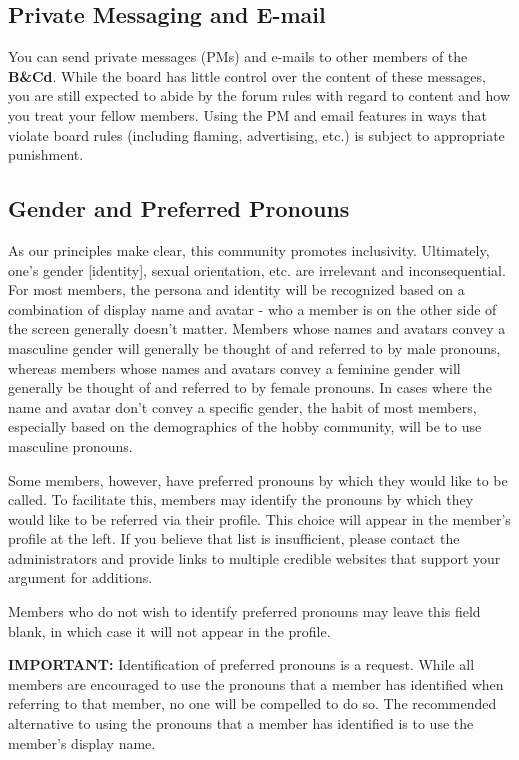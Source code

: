 \documentclass[12pt]{article}
\newcommand{\BnC}{{\textbf{B\&Cd}}}%
\begin{document}
\subsection{Private Messaging and E-mail}

You can send private messages (PMs) and e-mails to other members of the 
{\BnC}. While the board has little control over the 
content of these messages, you are still expected to abide by the forum 
rules with regard to content and how you treat your fellow members. 
Using the PM and email features in ways that violate board rules 
(including flaming, advertising, etc.) is subject to appropriate 
punishment.

\subsection{Gender and Preferred Pronouns}

As our principles make clear, this community promotes inclusivity. 
Ultimately, one's gender [identity], sexual orientation, etc. are 
irrelevant and inconsequential. For most members, the persona and 
identity will be recognized based on a combination of display name and 
avatar - who a member is on the other side of the screen generally 
doesn't matter. Members whose names and avatars convey a masculine 
gender will generally be thought of and referred to by male pronouns, 
whereas members whose names and avatars convey a feminine gender will 
generally be thought of and referred to by female pronouns. In cases 
where the name and avatar don't convey a specific gender, the habit of 
most members, especially based on the demographics of the hobby 
community, will be to use masculine pronouns.

Some members, however, have preferred pronouns by which they would like 
to be called. To facilitate this, members may identify the pronouns by 
which they would like to be referred via their profile. This choice 
will appear in the member's profile at the left. If you believe that 
list is insufficient, please contact the administrators and provide 
links to multiple credible websites that support your argument for 
additions.

Members who do not wish to identify preferred pronouns may leave this 
field blank, in which case it will not appear in the profile.

{\textbf{IMPORTANT:}} Identification of preferred pronouns is a request. While all 
members are encouraged to use the pronouns that a member has identified 
when referring to that member, no one will be compelled to do so. The 
recommended alternative to using the pronouns that a member has 
identified is to use the member's display name.
\end{document}
